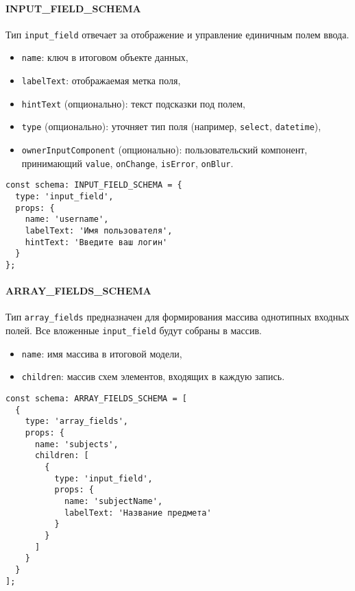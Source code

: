 \paragraph{INPUT\_FIELD\_SCHEMA}
Тип \texttt{input\_field} отвечает за отображение и управление единичным полем ввода.
\begin{itemize}
  \item \texttt{name}: ключ в итоговом объекте данных,
  \item \texttt{labelText}: отображаемая метка поля,
  \item \texttt{hintText} (опционально): текст подсказки под полем,
  \item \texttt{type} (опционально): уточняет тип поля (например, \texttt{select}, \texttt{datetime}),
  \item \texttt{ownerInputComponent} (опционально): пользовательский компонент, принимающий \texttt{value}, \texttt{onChange}, \texttt{isError}, \texttt{onBlur}.
\end{itemize}

\begin{lstlisting}[caption={Пример INPUT\_FIELD\_SCHEMA}]
const schema: INPUT_FIELD_SCHEMA = {
  type: 'input_field',
  props: {
    name: 'username',
    labelText: 'Имя пользователя',
    hintText: 'Введите ваш логин'
  }
};
\end{lstlisting}

\paragraph{ARRAY\_FIELDS\_SCHEMA}
Тип \texttt{array\_fields} предназначен для формирования массива однотипных входных полей. Все вложенные \texttt{input\_field} будут собраны в массив.
\begin{itemize}
  \item \texttt{name}: имя массива в итоговой модели,
  \item \texttt{children}: массив схем элементов, входящих в каждую запись.
\end{itemize}

\begin{lstlisting}[caption={Пример ARRAY\_FIELDS\_SCHEMA}]
const schema: ARRAY_FIELDS_SCHEMA = [
  {
    type: 'array_fields',
    props: {
      name: 'subjects',
      children: [
        {
          type: 'input_field',
          props: {
            name: 'subjectName',
            labelText: 'Название предмета'
          }
        }
      ]
    }
  }
];
\end{lstlisting}

